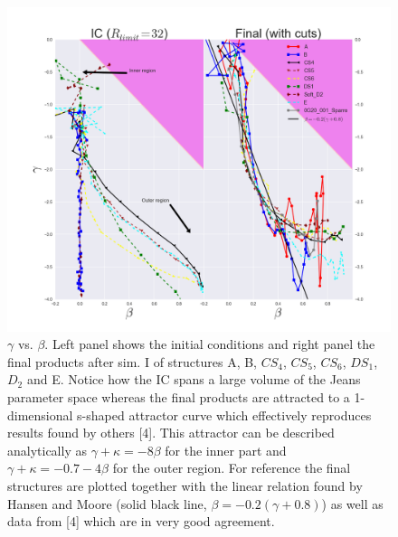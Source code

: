 \begin{figure}[!htbp]
\centering
\includegraphics[width=1.0\linewidth]{img/Fig_beta_gamma_ABCS4CS5CS6DS1D2E_IC_Final_R_limit_32.png}
\caption{$\gamma$ vs. $\beta$. Left panel shows the initial conditions and right panel the final products after sim. I of structures A, B, $CS_4$, $CS_5$, $CS_6$, $DS_1$, $D_2$ and E. Notice how the IC spans a large volume of the Jeans parameter space whereas the final products are attracted to a 1-dimensional s-shaped attractor curve which effectively reproduces results found by others [4]. This attractor can be described analytically as $\gamma + \kappa = -8\beta $ for the inner part and $\gamma + \kappa = -0.7-4\beta $ for the outer region. For reference the final structures are plotted together with the linear relation found by Hansen and Moore (solid black line, $ \beta = -0.2(\gamma + 0.8)$) as well as data from [4] which are in very good agreement.}
\label{fig:test}
\end{figure}

